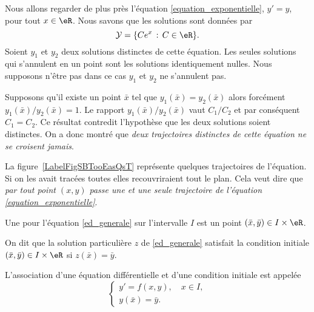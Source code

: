 \begin{example}
	Nous allons regarder de plus près l'équation \eqref{equation_exponentielle}, \( y'=y\), pour tout \( x\in\eR\). Nous savons que les solutions sont données par
	\begin{equation}
		\mathcal{Y} = \{Ce^x\, : \, C\in\eR\}.
	\end{equation}
	Soient \( y_1\) et \( y_2\) deux solutions distinctes de cette équation. Les seules solutions qui s'annulent en un point sont les solutions identiquement nulles. Nous supposons n'être pas dans ce cas \( y_1\) et \( y_2\) ne s'annulent pas.

	Supposons qu'il existe un point \( \bar x\) tel que \( y_1(\bar x) = y_2 (\bar x)\) alors forcément \( y_1(\bar x)/y_2 (\bar x)=1\). Le rapport \( y_1(\bar x)/y_2 (\bar x)\) vaut \( C_1/C_2\) et par conséquent \( C_1 = C_2\). Ce résultat contredit l'hypothèse que les deux solutions soient distinctes. On a donc montré que \emph{deux trajectoires distinctes de cette équation ne se croisent jamais}.

	\newcommand{\CaptionFigSBTooEasQsT}{Quelques trajectoires de l'équation \( y'=y\).}
	

	La figure~\ref{LabelFigSBTooEasQsT} représente quelques trajectoires de l'équation. Si on les avait tracées toutes elles recouvriraient tout le plan. Cela veut dire que \emph{par tout point \( (x,y)\) passe une et une seule trajectoire de l'équation \eqref{equation_exponentielle}}.

\end{example}
\begin{definition}
	Une  pour l'équation \eqref{ed_generale} sur l'intervalle \(I\) est un point \((\bar x, \bar y)\in I\times\eR\).

	On dit que la solution particulière \(z\) de \eqref{ed_generale} satisfait la condition initiale \((\bar x, \bar y)\in I\times\eR\) si \(z(\bar x) =\bar y\).
\end{definition}
\begin{definition}
	L'association d'une équation différentielle et d'une condition initiale est appelée 
	\begin{equation}\label{plme_cauchy}
		\begin{cases}
			y'= f(x,y), \quad x\in I, \\
			y(\bar x) = \bar y.
		\end{cases}
	\end{equation}
\end{definition}
